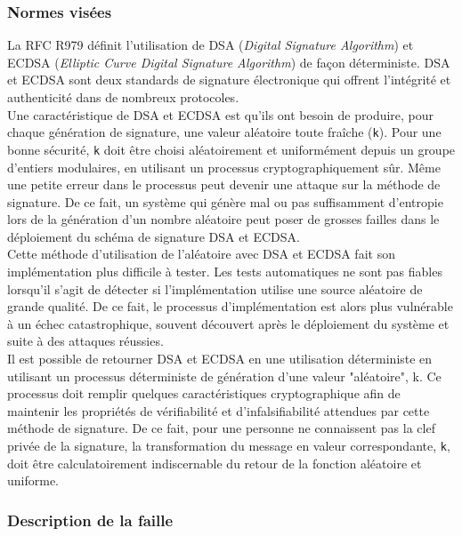 		\subsubsection{Normes visées}

		La RFC R979 \cite{rfc6979} définit l'utilisation de DSA (\textit{Digital Signature Algorithm}) et ECDSA (\textit{Elliptic Curve Digital Signature Algorithm}) de façon déterministe. DSA et ECDSA sont deux standards de signature électronique qui offrent l'intégrité et authenticité dans de nombreux protocoles.\\

		Une caractéristique de DSA et ECDSA est qu'ils ont besoin de produire, pour chaque génération de signature, une valeur aléatoire toute fraîche (\texttt{k}). Pour une bonne sécurité, \texttt{k} doit être choisi aléatoirement et uniformément depuis un groupe d'entiers modulaires, en utilisant un processus cryptographiquement sûr. Même une petite erreur dans le processus peut devenir une attaque sur la méthode de signature. De ce fait, un système qui génère mal ou pas suffisamment d'entropie lors de la génération d'un nombre aléatoire peut poser de grosses failles dans le déploiement du schéma de signature DSA et ECDSA.\\

		Cette méthode d'utilisation de l'aléatoire avec DSA et ECDSA fait son implémentation plus difficile à tester. Les tests automatiques ne sont pas fiables lorsqu'il s'agit de détecter si l'implémentation utilise une source aléatoire de grande qualité. De ce fait, le processus d'implémentation est alors plus vulnérable à un échec catastrophique, souvent découvert après le déploiement du système et suite à des attaques réussies.\\

		Il est possible de retourner DSA et ECDSA en une utilisation déterministe en utilisant un processus déterministe de génération d'une valeur "aléatoire", k. Ce processus doit remplir quelques caractéristiques cryptographique afin de maintenir les propriétés de vérifiabilité et d'infalsifiabilité attendues par cette méthode de signature. De ce fait, pour une personne ne connaissent pas la clef privée de la signature, la transformation du message en valeur correspondante, \texttt{k}, doit être calculatoirement indiscernable du retour de la fonction aléatoire et uniforme.
		
		\subsubsection{Description de la faille}
			
